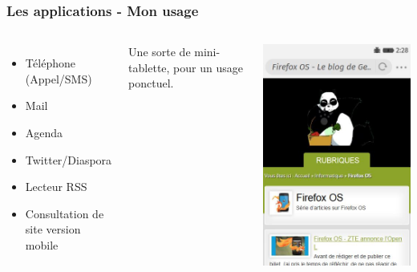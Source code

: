 \documentclass{beamer}
\begin{document}
\begin{frame}
\frametitle{Les applications - Mon usage}
\begin{columns}[c] 
\begin{itemize}
\item Téléphone (Appel/SMS)
\item Mail
\item Agenda
\item Twitter/Diaspora
\item Lecteur RSS
\item Consultation de site version mobile
\end{itemize}
Une sorte de mini-tablette, pour un usage ponctuel.
\begin{center}
\includegraphics[scale=0.6]{./images/site_version_mobile.jpg} 
\end{center}
\end{columns}
\end{frame}
\end{document}
